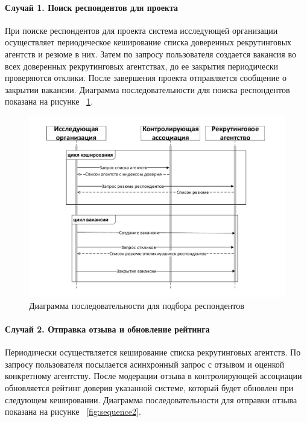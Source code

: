 \paragraph{Случай 1. Поиск респондентов для проекта}

При поиске респондентов для проекта система исследующей организации осуществляет периодическое кеширование списка доверенных рекрутинговых агентств и резюме в них. Затем по запросу пользователя создается вакансия во всех доверенных рекрутинговых агентствах, до ее закрытия периодически проверяются отклики. После завершения проекта отправляется сообщение о закрытии вакансии.
Диаграмма последовательности для поиска респондентов показана на рисунке ~\ref{fig:sequence1}.
\begin{figure}[ht]
  \centering
  \includegraphics[width=\textwidth]{include/sequence1.pdf}
\caption{Диаграмма последовательности для подбора респондентов}
\label{fig:sequence1}
\end{figure}

\paragraph{Случай 2. Отправка отзыва и обновление рейтинга}

Периодически осуществляется кеширование списка рекрутинговых агентств. По запросу пользователя посылается асинхронный запрос с отзывом и оценкой конкретному агентству. После модерации отзыва в контролирующей ассоциации обновляется рейтинг доверия указанной системе, который будет обновлен при следующем кешировании.  
Диаграмма последовательности для отправки отзыва показана на рисунке ~\ref{fig:sequence2}.

